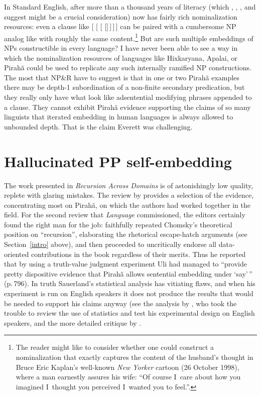 \documentclass[output=paper,colorlinks,citecolor=brown
]{langscibook}
\begin{document}
In Standard English, after more than a thousand years of literacy
(which \citealt{ONeil77}, \citealt{Givon79}, \citealt{Mithun84}, and
\citealt{Kalmar85} suggest might be a crucial consideration) now has
fairly rich nominalization resources: even a clause like
 [ [
[ []\,]\,]\,] can be paired with
a cumbersome NP analog like  with roughly
the same content.\footnote{\label{cartoon}
   The reader might like to consider whether one could construct a
   nominalization that exactly captures the content of the husband's
   thought in Bruce Eric Kaplan's well-known \textit{New Yorker}
   cartoon (26 October 1998), where a man earnestly assures his wife:
   ``Of course I~care about how you imagined I~thought you perceived
   I~wanted you to feel.''.}
But are such multiple embeddings of NPs constructible in every language?
I have never been able to see a way in which the nominalization resources
of languages like Hixkaryana, Apalai, or Pirah{\~a} could be used to
replicate any such internally ramified NP constructions. The most that
NP\&R have to suggest is that in one or two Pirah{\~a} examples there
may be depth-1 subordination of a non-finite secondary predication, but
they really only have what look like adsentential modifying phrases
appended to a clause. They cannot exhibit Pirah{\~a} evidence supporting
the claims of so many linguists that iterated embedding in human
languages is always allowed to unbounded depth. That is the claim
Everett was challenging.

\section{Hallucinated PP self-embedding}\label{ppsection}

The work presented in \textit{Recursion Across Domains} \citep{AmMaNeRo18}
is of astonishingly low quality, replete with glaring mistakes. The review
by \citet{EverGibs19} provides a selection of the evidence, concentrating
most on Pirah{\~a}, on which the authors had worked together in the field.
For the second review that \textit{Language} commissioned, the editors
certainly found the right man for the job: \citet{Hornstein19} faithfully
repeated Chomsky's theoretical position on ``recursion'', elaborating
the rhetorical escape-hatch arguments (see Section~\ref{intro} above),
and then proceeded to uncritically endorse all data-oriented contributions
in the book regardless of their merits. Thus he reported that by using a
truth-value judgment experiment Uli \citet{Sauerland18} had managed to
``provide pretty dispositive evidence that Pirah{\~a} allows sentential
embedding under `say'\,'' (p.\,796). In truth Sauerland's statistical
analysis has vitiating flaws, and when his experiment is run on English
speakers it does not produce the results that would be needed to
support his claims anyway (see the analysis by
\citealt[781--784]{EverGibs19}, who took the trouble to review the use
of statistics and test his experimental design on English speakers,
and the more detailed critique by .
\end{document}
